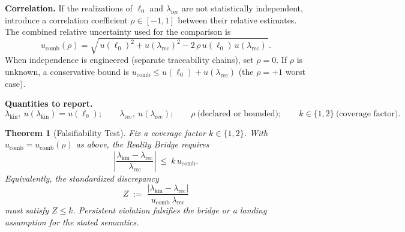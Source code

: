 \documentclass[11pt]{article}
\theoremstyle{plain}
\newtheorem{theorem}{Theorem}
\theoremstyle{definition}
\theoremstyle{remark}
\begin{document}
\medskip
\noindent\textbf{Correlation.} If the realizations of \(\ell_{0}\) and \(\lambda_{\mathrm{rec}}\) are not statistically independent, introduce a correlation coefficient \(\rho\in[-1,1]\) between their relative estimates. The combined relative uncertainty used for the comparison is
\[
u_{\mathrm{comb}}(\rho)
=\sqrt{\,u(\ell_{0})^{2}+u(\lambda_{\mathrm{rec}})^{2}-2\,\rho\,u(\ell_{0})\,u(\lambda_{\mathrm{rec}})\,}.
\]
When independence is engineered (separate traceability chains), set \(\rho=0\). If \(\rho\) is unknown, a conservative bound is \(u_{\mathrm{comb}}\le u(\ell_{0})+u(\lambda_{\mathrm{rec}})\) (the \(\rho=+1\) worst case).

\medskip
\noindent\textbf{Quantities to report.}
\[
\lambda_{\mathrm{kin}},\ u(\lambda_{\mathrm{kin}})=u(\ell_{0});\qquad
\lambda_{\mathrm{rec}},\ u(\lambda_{\mathrm{rec}});\qquad
\rho\ \text{(declared or bounded)};\qquad
k\in\{1,2\}\ \text{(coverage factor)}.
\]

\begin{theorem}[Falsifiability Test]
Fix a coverage factor \(k\in\{1,2\}\). With \(u_{\mathrm{comb}}=u_{\mathrm{comb}}(\rho)\) as above, the Reality Bridge requires
\[
\left|\frac{\lambda_{\mathrm{kin}}-\lambda_{\mathrm{rec}}}{\lambda_{\mathrm{rec}}}\right|
\ \le\ 
k\,u_{\mathrm{comb}}.
\]
Equivalently, the standardized discrepancy
\[
Z\;:=\;\frac{|\lambda_{\mathrm{kin}}-\lambda_{\mathrm{rec}}|}{u_{\mathrm{comb}}\ \lambda_{\mathrm{rec}}}
\]
must satisfy \(Z\le k\). Persistent violation falsifies the bridge or a landing assumption for the stated semantics.
\end{theorem}
\end{document}
